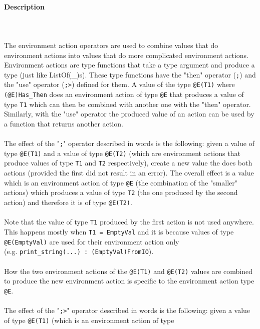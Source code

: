 \documentclass{article}
\begin{document}
\paragraph{Description}
\mbox{} \\\\
The environment action operators are used to combine values that do environment
actions into values that do more complicated environment actions. Environment
actions are type functions that take a type argument and produce a type (just
like ListOf(_)s). These type functions have the "then" operator (\texttt{;})
and the "use" operator (\texttt{;>}) defined for them.  A value of the type
\texttt{@E(T1)} where \texttt{(@E)Has_Then} does an environment action of type
\texttt{@E} that produces a value of type \texttt{T1} which can then be
combined with another one with the "then" operator. Similarly, with the "use"
operator the produced value of an action can be used by a function that returns
another action.
\\\\
The effect of the "\texttt{;}" operator described in words is the following:
given a value of type \texttt{@E(T1)} and a value of type \texttt{@E(T2)}
(which are environment actions that produce values of type \texttt{T1} and
\texttt{T2} respectively), create a new value the does both actions (provided
the first did not result in an error).  The overall effect is a value which is
an environment action of type \texttt{@E} (the combination of the "smaller"
actions) which produces a value of type \texttt{T2} (the one produced by the
second action) and therefore it is of type \texttt{@E(T2)}.
\\\\
Note that the value of type \texttt{T1} produced by the first action is not
used anywhere. This happens mostly when \texttt{T1 = EmptyVal} and it is
because values of type \texttt{@E(EmptyVal)} are used for their environment
action only \\(e.g. \texttt{print_string(...)\ :\ (EmptyVal)FromIO}).
\\\\
How the two environment actions of the \texttt{@E(T1)} and \texttt{@E(T2)}
values are combined to produce the new environment action is specific to the
environment action type \texttt{@E}.
\\\\
The effect of the "\texttt{;>}" operator described in words is the following:
given a value of type \texttt{@E(T1)} (which is an environment action of type
\end{document}
